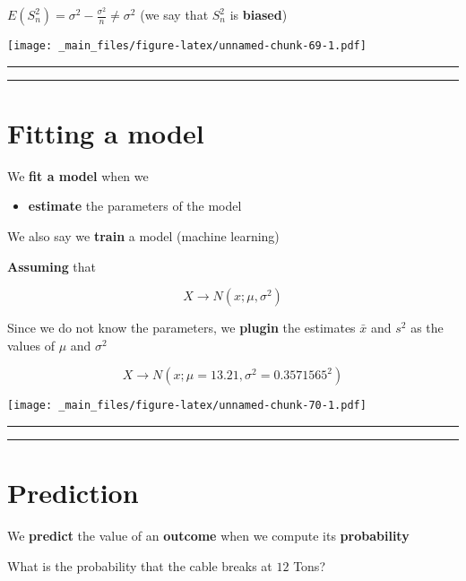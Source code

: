 \documentclass[
]{book}
\providecommand{\tightlist}{%
  \setlength{\itemsep}{0pt}\setlength{\parskip}{0pt}}
\begin{document}
\(E(S_n^2) = \sigma^2-\frac{\sigma^2}{n} \neq \sigma^2\) (we say that \(S_n^2\) is \textbf{biased})

\texttt{[image: \_main\_files/figure-latex/unnamed-chunk-69-1.pdf]}

\begin{center}\rule{0.5\linewidth}{0.5pt}\end{center}

\begin{center}\rule{0.5\linewidth}{0.5pt}\end{center}

\hypertarget{fitting-a-model}{%
\section{Fitting a model}\label{fitting-a-model}}

We \textbf{fit a model} when we

\begin{itemize}
\tightlist
\item
  \textbf{estimate} the parameters of the model
\end{itemize}

We also say we \textbf{train} a model (machine learning)

\textbf{Assuming} that

\[X \rightarrow N(x; \mu, \sigma^2)\]

Since we do not know the parameters, we \textbf{plugin} the estimates \(\bar{x}\) and \(s^2\) as the values of \(\mu\)
and \(\sigma^2\)

\[X \rightarrow N(x; \mu=13.21, \sigma^2=0.3571565^2)\]

\texttt{[image: \_main\_files/figure-latex/unnamed-chunk-70-1.pdf]}

\begin{center}\rule{0.5\linewidth}{0.5pt}\end{center}

\begin{center}\rule{0.5\linewidth}{0.5pt}\end{center}

\hypertarget{prediction}{%
\section{Prediction}\label{prediction}}

We \textbf{predict} the value of an \textbf{outcome} when we compute its \textbf{probability}

What is the probability that the cable breaks at \(12\) Tons?
\end{document}
